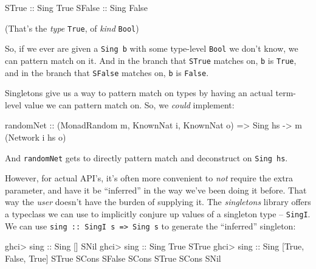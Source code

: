 \documentclass[]{article}
\newenvironment{Shaded}{}{}
\newcommand{\CharTok}[1]{\textcolor[rgb]{0.25,0.44,0.63}{#1}}
\newcommand{\DataTypeTok}[1]{\textcolor[rgb]{0.56,0.13,0.00}{#1}}
\newcommand{\NormalTok}[1]{#1}
\newcommand{\OperatorTok}[1]{\textcolor[rgb]{0.40,0.40,0.40}{#1}}
\newcommand{\OtherTok}[1]{\textcolor[rgb]{0.00,0.44,0.13}{#1}}
\begin{document}
\begin{Shaded}
\begin{Highlighting}[]
\DataTypeTok{STrue}\OtherTok{  ::} \DataTypeTok{Sing} \DataTypeTok{\textquotesingle{}True}
\DataTypeTok{SFalse}\OtherTok{ ::} \DataTypeTok{Sing} \DataTypeTok{\textquotesingle{}False}
\end{Highlighting}
\end{Shaded}

(That's the \emph{type} \texttt{\textquotesingle{}True}, of \emph{kind}
\texttt{Bool})

So, if we ever are given a \texttt{Sing\ b} with some type-level \texttt{Bool}
we don't know, we can pattern match on it. And in the branch that \texttt{STrue}
matches on, \texttt{b} is \texttt{\textquotesingle{}True}, and in the branch
that \texttt{SFalse} matches on, \texttt{b} is \texttt{False}.

Singletons give us a way to pattern match on types by having an actual
term-level value we can pattern match on. So, we \emph{could} implement:

\begin{Shaded}
\begin{Highlighting}[]
\OtherTok{randomNet ::}\NormalTok{ (}\DataTypeTok{MonadRandom}\NormalTok{ m, }\DataTypeTok{KnownNat}\NormalTok{ i, }\DataTypeTok{KnownNat}\NormalTok{ o)}
          \OtherTok{=\textgreater{}} \DataTypeTok{Sing}\NormalTok{ hs }\OtherTok{{-}\textgreater{}}\NormalTok{ m (}\DataTypeTok{Network}\NormalTok{ i hs o)}
\end{Highlighting}
\end{Shaded}

And \texttt{randomNet} gets to directly pattern match and deconstruct on
\texttt{Sing\ hs}.

However, for actual API's, it's often more convenient to \emph{not} require the
extra parameter, and have it be ``inferred'' in the way we've been doing it
before. That way the \emph{user} doesn't have the burden of supplying it. The
\emph{singletons} library offers a typeclass we can use to implicitly conjure up
values of a singleton type -- \texttt{SingI}. We can use
\texttt{sing\ ::\ SingI\ s\ =\textgreater{}\ Sing\ s} to generate the
``inferred'' singleton:

\begin{Shaded}
\begin{Highlighting}[]
\NormalTok{ghci}\OperatorTok{\textgreater{}}\OtherTok{ sing ::} \DataTypeTok{Sing}\NormalTok{ \textquotesingle{}[]}
\DataTypeTok{SNil}
\NormalTok{ghci}\OperatorTok{\textgreater{}}\OtherTok{ sing ::} \DataTypeTok{Sing} \DataTypeTok{\textquotesingle{}True}
\DataTypeTok{STrue}
\NormalTok{ghci}\OperatorTok{\textgreater{}}\OtherTok{ sing ::} \DataTypeTok{Sing} \CharTok{\textquotesingle{}[\textquotesingle{}}\DataTypeTok{True}\NormalTok{, }\DataTypeTok{\textquotesingle{}False}\NormalTok{, }\DataTypeTok{\textquotesingle{}True}\NormalTok{]}
\DataTypeTok{STrue} \OtherTok{\textasciigrave{}SCons\textasciigrave{}} \DataTypeTok{SFalse} \OtherTok{\textasciigrave{}SCons\textasciigrave{}} \DataTypeTok{STrue} \OtherTok{\textasciigrave{}SCons\textasciigrave{}} \DataTypeTok{SNil}
\end{Highlighting}
\end{Shaded}
\end{document}
